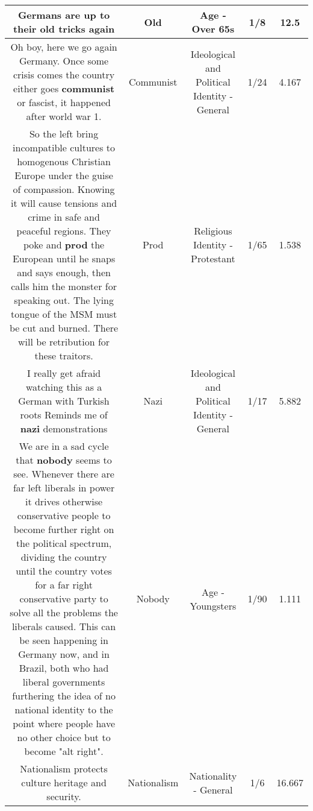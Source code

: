 \documentclass[11pt]{article}
\newlength\mylength
\begin{document}
\begin{center}
\begin{longtable}{|C{.65\mylength}|C{.30\mylength}|C{.12\mylength}|C{.12\mylength}|C{.12\mylength}|}
  \small Germans are up to their \textbf{old} tricks again\normalsize   & Old & Age - Over 65s & 1/8 & 12.5 \\  \hline
  \small Oh boy, here we go again Germany. Once some crisis comes the country either goes \textbf{communist} or fascist, it happened after world war 1.\normalsize   & Communist &  Ideological and Political Identity - General & 1/24 & 4.167 \\  \hline
  \small So the left bring incompatible cultures to homogenous Christian Europe under the guise of compassion. Knowing it will cause tensions and crime in safe and peaceful regions. They poke and \textbf{prod} the European until he snaps and says enough, then calls him the monster for speaking out. The lying tongue of the MSM must be cut and burned. There will be retribution for these traitors.\normalsize   & Prod & Religious Identity - Protestant & 1/65 & 1.538 \\  \hline
  \small I really get afraid watching this as a German with Turkish roots Reminds me of \textbf{nazi} demonstrations\normalsize   & Nazi &  Ideological and Political Identity - General & 1/17 & 5.882 \\  \hline
  \small We are in a sad cycle that \textbf{nobody} seems to see. Whenever there are far left liberals in power it drives otherwise conservative people to become further right on the political spectrum, dividing the country until the country votes for a far right conservative party to solve all the problems the liberals caused. This can be seen happening in Germany now, and in Brazil, both who had liberal governments furthering the idea of no national identity to the point where people have no other choice but to become "alt right".\normalsize   & Nobody & Age - Youngsters & 1/90 & 1.111 \\  \hline
  \small Nationalism protects culture heritage and security.\normalsize   & Nationalism & Nationality - General & 1/6 & 16.667 \\  \hline

\end{longtable}
\end{center}
\end{document}
